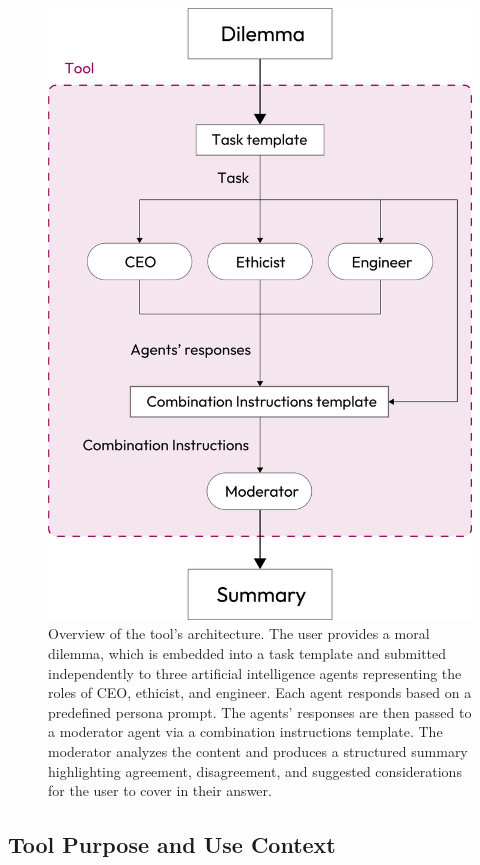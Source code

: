\begin{figure}[h]
  \centering
  \includegraphics[width=\linewidth]{impl}
  \caption{Overview of the tool's architecture. The user provides a moral dilemma, which is embedded into a task template and submitted independently to three artificial intelligence agents representing the roles of CEO, ethicist, and engineer. Each agent responds based on a predefined persona prompt. The agents' responses are then passed to a moderator agent via a combination instructions template. The moderator analyzes the content and produces a structured summary highlighting agreement, disagreement, and suggested considerations for the user to cover in their answer.}
  \label{fig:impl}
\end{figure}

\subsection{Tool Purpose and Use Context}

